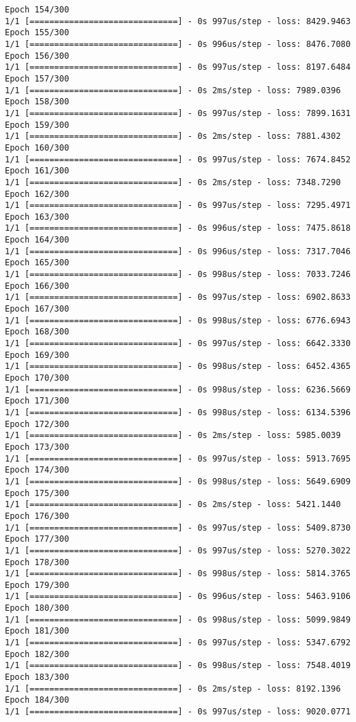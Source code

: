 \documentclass[11pt]{article}
\begin{document}
\begin{Verbatim}[commandchars=\\\{\}]
Epoch 154/300
1/1 [==============================] - 0s 997us/step - loss: 8429.9463
Epoch 155/300
1/1 [==============================] - 0s 996us/step - loss: 8476.7080
Epoch 156/300
1/1 [==============================] - 0s 997us/step - loss: 8197.6484
Epoch 157/300
1/1 [==============================] - 0s 2ms/step - loss: 7989.0396
Epoch 158/300
1/1 [==============================] - 0s 997us/step - loss: 7899.1631
Epoch 159/300
1/1 [==============================] - 0s 2ms/step - loss: 7881.4302
Epoch 160/300
1/1 [==============================] - 0s 997us/step - loss: 7674.8452
Epoch 161/300
1/1 [==============================] - 0s 2ms/step - loss: 7348.7290
Epoch 162/300
1/1 [==============================] - 0s 997us/step - loss: 7295.4971
Epoch 163/300
1/1 [==============================] - 0s 996us/step - loss: 7475.8618
Epoch 164/300
1/1 [==============================] - 0s 996us/step - loss: 7317.7046
Epoch 165/300
1/1 [==============================] - 0s 998us/step - loss: 7033.7246
Epoch 166/300
1/1 [==============================] - 0s 997us/step - loss: 6902.8633
Epoch 167/300
1/1 [==============================] - 0s 998us/step - loss: 6776.6943
Epoch 168/300
1/1 [==============================] - 0s 997us/step - loss: 6642.3330
Epoch 169/300
1/1 [==============================] - 0s 998us/step - loss: 6452.4365
Epoch 170/300
1/1 [==============================] - 0s 998us/step - loss: 6236.5669
Epoch 171/300
1/1 [==============================] - 0s 998us/step - loss: 6134.5396
Epoch 172/300
1/1 [==============================] - 0s 2ms/step - loss: 5985.0039
Epoch 173/300
1/1 [==============================] - 0s 997us/step - loss: 5913.7695
Epoch 174/300
1/1 [==============================] - 0s 998us/step - loss: 5649.6909
Epoch 175/300
1/1 [==============================] - 0s 2ms/step - loss: 5421.1440
Epoch 176/300
1/1 [==============================] - 0s 997us/step - loss: 5409.8730
Epoch 177/300
1/1 [==============================] - 0s 997us/step - loss: 5270.3022
Epoch 178/300
1/1 [==============================] - 0s 998us/step - loss: 5814.3765
Epoch 179/300
1/1 [==============================] - 0s 996us/step - loss: 5463.9106
Epoch 180/300
1/1 [==============================] - 0s 998us/step - loss: 5099.9849
Epoch 181/300
1/1 [==============================] - 0s 997us/step - loss: 5347.6792
Epoch 182/300
1/1 [==============================] - 0s 998us/step - loss: 7548.4019
Epoch 183/300
1/1 [==============================] - 0s 2ms/step - loss: 8192.1396
Epoch 184/300
1/1 [==============================] - 0s 997us/step - loss: 9020.0771

\end{Verbatim}
\end{document}
